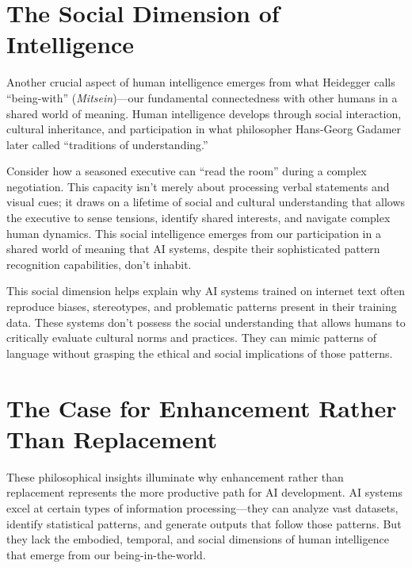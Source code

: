 \documentclass[
  Letterpaper,
]{scrbook}
\begin{document}
\section{The Social Dimension of
Intelligence}\label{the-social-dimension-of-intelligence}

Another crucial aspect of human intelligence emerges from what Heidegger
calls ``being-with'' (\emph{Mitsein})---our fundamental connectedness
with other humans in a shared world of meaning. Human intelligence
develops through social interaction, cultural inheritance, and
participation in what philosopher Hans-Georg Gadamer later called
``traditions of understanding.''

Consider how a seasoned executive can ``read the room'' during a complex
negotiation. This capacity isn't merely about processing verbal
statements and visual cues; it draws on a lifetime of social and
cultural understanding that allows the executive to sense tensions,
identify shared interests, and navigate complex human dynamics. This
social intelligence emerges from our participation in a shared world of
meaning that AI systems, despite their sophisticated pattern
recognition capabilities, don't
inhabit.

This social dimension helps explain why AI systems trained on internet
text often reproduce biases, stereotypes, and problematic patterns
present in their training data. These systems don't possess the social
understanding that allows humans to critically evaluate cultural norms
and practices. They can mimic patterns of language without grasping the
ethical and social implications of those patterns.

\section{\texorpdfstring{The Case for
Enhancement Rather Than
Replacement}{The Case for Enhancement Rather Than Replacement}}\label{the-case-for-enhancement-rather-than-replacement}

These philosophical insights illuminate why enhancement rather than
replacement represents the more productive path for AI development. AI
systems excel at certain types of information processing---they can
analyze vast datasets, identify statistical patterns, and generate
outputs that follow those patterns. But they lack the embodied,
temporal, and social dimensions of human intelligence that emerge from
our being-in-the-world.
\end{document}
